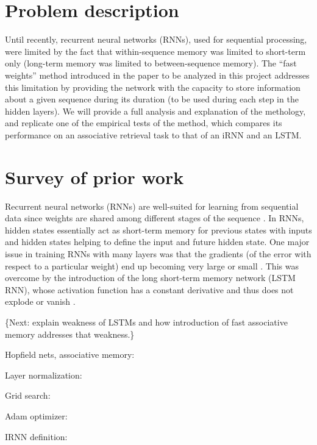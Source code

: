 \section{Problem description}

Until recently, recurrent neural networks (RNNs), used for sequential processing, were limited by the fact that within-sequence memory was limited to short-term only (long-term memory was limited to between-sequence memory). The ``fast weights'' method introduced in the paper to be analyzed in this project \cite{NIPS2016_6057} addresses this limitation by providing the network with the capacity to store information about a given sequence during its duration (to be used during each step in the hidden layers). We will provide a full analysis and explanation of the methology, and replicate one of the empirical tests of the method, which compares its performance on an associative retrieval task to that of an iRNN and an LSTM.

\section{Survey of prior work}

Recurrent neural networks (RNNs) are well-suited for learning from sequential data since weights are shared among different stages of the sequence \cite[p. 373]{Goodfellow-et-al-2016}. In RNNs, hidden states essentially act as short-term memory for previous states with inputs and hidden states helping to define the input and future hidden state. One major issue in training RNNs with many layers was that the gradients (of the error with respect to a particular weight) end up becoming very large or small \cite[p. 16]{DBLP:journals/nn/Schmidhuber15}. This was overcome by the introduction of the long short-term memory network (LSTM RNN), whose activation function has a constant derivative and thus does not explode or vanish \cite[p. 19]{DBLP:journals/nn/Schmidhuber15}.

\{Next: explain weakness of LSTMs and how introduction of fast associative memory addresses that weakness.\}

Hopfield nets, associative memory: \cite{Mackay03informationtheory}

Layer normalization: \cite{1607.06450}

Grid search: \cite{Goodfellow-et-al-2016}

Adam optimizer: \cite{1412.6980}

IRNN definition: \cite{1511.03771}

